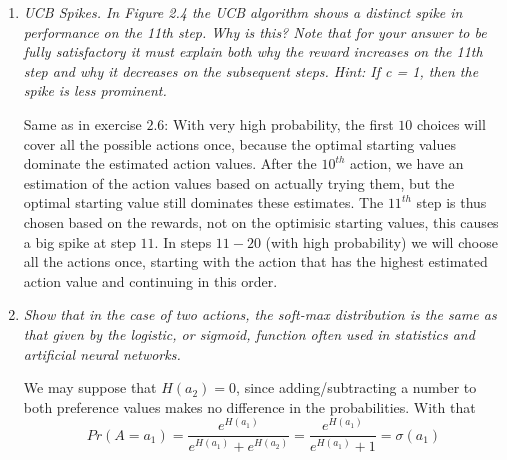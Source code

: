 \documentclass[12pt,a4paper]{article}
\begin{document}
\begin{enumerate}
\item
  \textit{UCB Spikes. In Figure 2.4 the UCB algorithm shows a distinct spike
  in performance on the 11th step. Why is this? Note that for your answer to be fully
  satisfactory it must explain both why the reward increases on the 11th step and why it
  decreases on the subsequent steps. Hint: If c = 1, then the spike is less prominent.}

  Same as in exercise $2.6$: With very high probability, the first $10$ choices will cover all the possible actions
  once, because the optimal starting values dominate the estimated action values.
  After the $10^{th}$ action, we have an estimation of the action values based
  on actually trying them, but the optimal starting value still dominates these estimates.
  The $11^{th}$ step is thus chosen based on the rewards, not on the optimisic starting values,
  this causes a big spike at step $11$. In steps $11-20$ (with high probability) we will
  choose all the actions once, starting with the action that has the highest estimated
  action value and continuing in this order.

\item
  \textit{Show that in the case of two actions, the soft-max distribution is the same
as that given by the logistic, or sigmoid, function often used in statistics and artificial
neural networks.}

  We may suppose that $H(a_2) = 0$, since adding/subtracting a number to both preference
  values makes no difference in the probabilities. With that
  \[
  Pr(A = a_1) = \frac{e^{H(a_1)}}{e^{H(a_1)} + e^{H(a_2)}} = \frac{e^{H(a_1)}}{e^{H(a_1)} + 1} = \sigma(a_1)
  \]
\end{enumerate}
\end{document}
